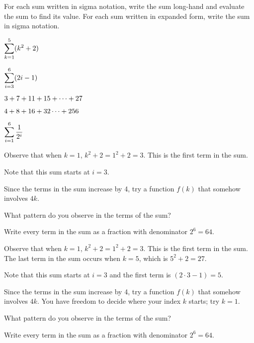 \begin{activity} \label{A:4.2.1}  For each sum written in sigma notation, write the sum long-hand and evaluate the sum to find its value.  For each sum written in expanded form, write the sum in sigma notation.
\ba
	\item $\displaystyle \sum_{k=1}^{5} (k^2 + 2)$
	\item $\displaystyle \sum_{i=3}^{6} (2i-1)$
	\item $\displaystyle 3 + 7 + 11 + 15 +  \cdots + 27$
	\item $\displaystyle 4 + 8 + 16 + 32 \cdots + 256$
	\item $\displaystyle \sum_{i=1}^{6} \frac{1}{2^i}$
\ea
\end{activity}
\begin{smallhint}
\ba
	\item Observe that when $k = 1$, $k^2 + 2 = 1^2 + 2 = 3$.  This is the first term in the sum.
	\item Note that this sum starts at $i = 3$.
	\item Since the terms in the sum increase by 4, try a function $f(k)$ that somehow involves $4k$.
	\item What pattern do you observe in the terms of the sum?
	\item Write every term in the sum as a fraction with denominator $2^6 = 64$.
\ea
\end{smallhint}
\begin{bighint}
\ba
	\item Observe that when $k = 1$, $k^2 + 2 = 1^2 + 2 = 3$.  This is the first term in the sum.  The last term in the sum occurs when $k = 5$, which is $5^2 + 2 = 27$.
	\item Note that this sum starts at $i = 3$ and the first term is $(2\cdot 3 - 1) = 5$.
	\item Since the terms in the sum increase by 4, try a function $f(k)$ that somehow involves $4k$.  You have freedom to decide where your index $k$ starts; try $k = 1$.
	\item What pattern do you observe in the terms of the sum?
	\item Write every term in the sum as a fraction with denominator $2^6 = 64$.
\ea
\end{bighint}
